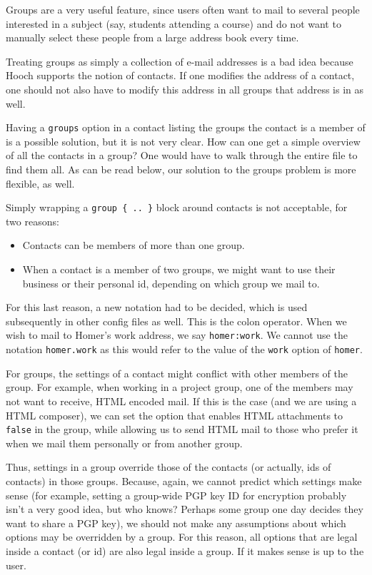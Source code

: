 \documentclass[a4paper]{article}
\begin{document}
Groups are a very useful feature, since users often want to mail to
several people interested in a subject (say, students attending a course)
and do not want to manually select these people from a large address
book every time.

Treating groups as simply a collection of e-mail addresses is a bad idea
because Hooch supports the notion of contacts.  If one modifies the
address of a contact, one should not also have to modify this address in
all groups that address is in as well.

Having a \texttt{groups} option in a contact listing the groups the
contact is a member of is a possible solution, but it is not very clear.
How can one get a simple overview of all the contacts in a group?  One would
have to walk through the entire file to find them all.  As can be read
below, our solution to the groups problem is more flexible, as well.

Simply wrapping a \texttt{group \{ .. \}} block around contacts is not
acceptable, for two reasons:
\begin{itemize}
\item Contacts can be members of more than one group.
\item When a contact is a member of two groups, we might want to use
	their business or their personal id, depending on which group we
	mail to.
\end{itemize}
For this last reason, a new notation had to be decided, which is used
subsequently in other config files as well.  This is the colon
operator.  When we wish to mail to Homer's work address, we say
\texttt{homer:work}.  We cannot use the notation \texttt{homer.work} as
this would refer to the value of the \texttt{work} option of \texttt{homer}.

For groups, the settings of a contact might conflict with other members
of the group.  For example, when working in a project group, one of the
members may not want to receive, HTML encoded mail.  If this is the
case (and we are using a HTML composer), we can set the option that
enables HTML attachments to \texttt{false} in the group, while allowing
us to send HTML mail to those who prefer it when we mail them personally
or from another group.

Thus, settings in a group override those of the contacts (or actually,
ids of contacts) in those groups.  Because, again, we cannot predict
which settings make sense (for example, setting a group-wide PGP key ID for
encryption probably isn't a very good idea, but who knows?  Perhaps some
group one day decides they want to share a PGP key), we should not make any
assumptions about which options may be overridden by a group.
For this reason, all options that are legal inside a contact (or id) are
also legal inside a group.  If it makes sense is up to the user.
\end{document}
